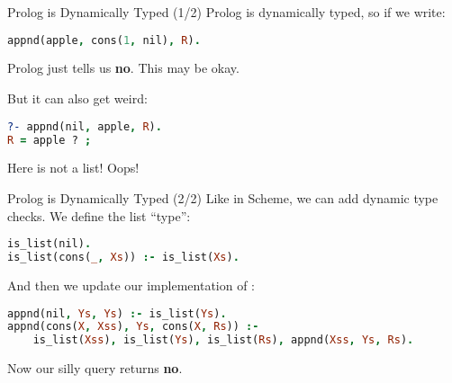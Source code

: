 \begin{frame}[fragile]{Prolog is Dynamically Typed (1/2)}
Prolog is dynamically typed, so if we write:

\begin{lstlisting}[language=prolog, xleftmargin=0.5cm]
appnd(apple, cons(1, nil), R).
\end{lstlisting}

Prolog just tells us \textbf{no}. This may be okay.

\pause

But it can also get weird:

\begin{lstlisting}[language=prolog, xleftmargin=0.5cm]
?- appnd(nil, apple, R).
R = apple ? ;
\end{lstlisting}

Here  is not a list! Oops!
\end{frame}
    
\begin{frame}[fragile]{Prolog is Dynamically Typed (2/2)}
Like in Scheme, we can add dynamic type checks. We define the list ``type'':

\begin{lstlisting}[language=prolog, xleftmargin=0.5cm]
is_list(nil).
is_list(cons(_, Xs)) :- is_list(Xs).
\end{lstlisting}

\pause

And then we update our implementation of :

\begin{lstlisting}[language=prolog, xleftmargin=0.5cm]
appnd(nil, Ys, Ys) :- is_list(Ys).
appnd(cons(X, Xss), Ys, cons(X, Rs)) :- 
    is_list(Xss), is_list(Ys), is_list(Rs), appnd(Xss, Ys, Rs).
\end{lstlisting}

Now our silly query  returns \textbf{no}.
\end{frame}

